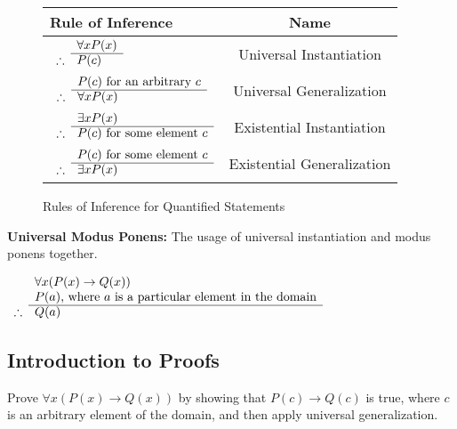 \documentclass[article, 11pt]{article}
\theoremstyle{definition}
\begin{document}
    \begin{figure}[H]
        \centering
        \begin{tabular}{|l|c|}
            \hline
            Rule of Inference & Name \\
            \hline
            $\begin{array}{rl}
                & \forall x P(x) \\
                \cline{2-2}
                \therefore & P(c)
            \end{array}$ & Universal Instantiation \\
            \hline
            $\begin{array}{rl}
                & P(c) \text{ for an arbitrary } c \\
                \cline{2-2}
                \therefore & \forall x P(x)
            \end{array}$ & Universal Generalization \\
            \hline
            $\begin{array}{rl}
                & \exists x P(x) \\
                \cline{2-2}
                \therefore & P(c) \text{ for some element } c
            \end{array}$ & Existential Instantiation \\
            \hline
            $\begin{array}{rl}
                & P(c) \text{ for some element } c \\
                \cline{2-2}
                \therefore & \exists x P(x)
            \end{array}$ & Existential Generalization \\
            \hline
        \end{tabular}
        \caption{Rules of Inference for Quantified Statements}
    \end{figure}
    \textbf{Universal Modus Ponens:} The usage of universal instantiation and modus ponens together.
    \begin{center}
        $\begin{array}{rl}
            & \forall x (P(x) \to Q(x)) \\
            & P(a) \text{, where } a \text{ is a particular element in the domain} \\
            \cline{2-2}
            \therefore & Q(a)
        \end{array}$
    \end{center}
    \subsection{Introduction to Proofs}
    Prove $\forall x(P(x) \to Q(x))$ by showing that $P(c) \to Q(c)$ is true, where $c$ is an arbitrary element of the domain, and then apply universal generalization.
\end{document}
